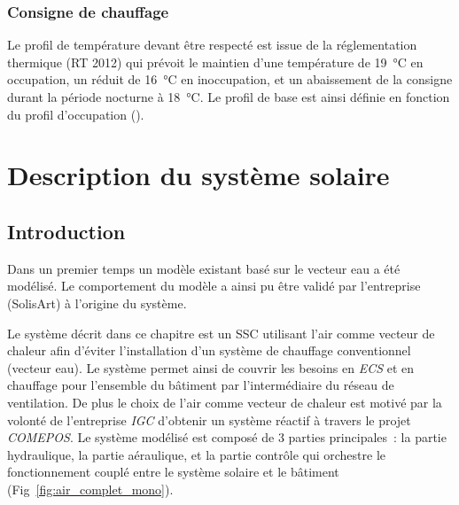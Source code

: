 

\subsubsection{Consigne de chauffage} %
\label{ssub:consigne_de_chauffage}
Le profil de température devant être respecté est issue de la réglementation thermique (RT
2012) qui prévoit le maintien d’une température de \SI{19}{\celsius} en occupation, un
réduit de \SI{16}{\celsius} en inoccupation, et un abaissement de la consigne durant la
période nocturne à \SI{18}{\celsius}. Le profil de base est ainsi définie en fonction du
profil d’occupation ().



\section{Description du système solaire} %
\label{sec:description_du_système_solaire}
\subsection{Introduction} %
\label{sub:introduction}

Dans un premier temps un modèle existant basé sur le vecteur eau a été modélisé.
Le comportement du modèle a ainsi pu être validé par l’entreprise (SolisArt) à
l’origine du système.

Le système décrit dans ce chapitre est un SSC utilisant l’air comme vecteur de chaleur
afin d’éviter l’installation d’un système de chauffage conventionnel (vecteur eau). Le
système permet ainsi de couvrir les besoins en \emph{ECS} et en chauffage pour l’ensemble du
bâtiment par l’intermédiaire du réseau de ventilation. De plus le choix de l’air comme
vecteur de chaleur est motivé par la volonté de l’entreprise \emph{IGC} d’obtenir un
système réactif à travers le projet \textit{COMEPOS}.
Le système modélisé est composé de 3 parties principales~: la partie
hydraulique, la partie aéraulique, et la partie contrôle qui orchestre le fonctionnement
couplé entre le système solaire et le bâtiment (Fig~\ref{fig:air_complet_mono}).

